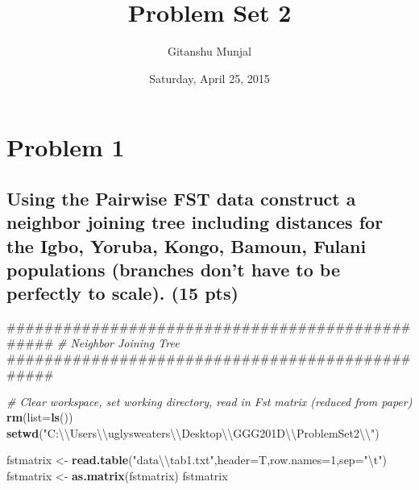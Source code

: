 \documentclass[]{article}
\title{Problem Set 2}
\author{Gitanshu Munjal}
\date{Saturday, April 25, 2015}
\newenvironment{Shaded}{\begin{snugshade}}{\end{snugshade}}
\newcommand{\KeywordTok}[1]{\textcolor[rgb]{0.13,0.29,0.53}{\textbf{{#1}}}}
\newcommand{\DataTypeTok}[1]{\textcolor[rgb]{0.13,0.29,0.53}{{#1}}}
\newcommand{\DecValTok}[1]{\textcolor[rgb]{0.00,0.00,0.81}{{#1}}}
\newcommand{\CharTok}[1]{\textcolor[rgb]{0.31,0.60,0.02}{{#1}}}
\newcommand{\StringTok}[1]{\textcolor[rgb]{0.31,0.60,0.02}{{#1}}}
\newcommand{\CommentTok}[1]{\textcolor[rgb]{0.56,0.35,0.01}{\textit{{#1}}}}
\newcommand{\NormalTok}[1]{{#1}}
\begin{document}
\maketitle


\section{Problem 1}\label{problem-1}

\subsection{Using the Pairwise FST data construct a neighbor joining
tree including distances for the Igbo, Yoruba, Kongo, Bamoun, Fulani
populations (branches don't have to be perfectly to scale). (15
pts)}\label{using-the-pairwise-fst-data-construct-a-neighbor-joining-tree-including-distances-for-the-igbo-yoruba-kongo-bamoun-fulani-populations-branches-dont-have-to-be-perfectly-to-scale.-15-pts}

\begin{Shaded}
\begin{Highlighting}[]
\NormalTok{################################################}
\CommentTok{# Neighbor Joining Tree}
\NormalTok{################################################}

\CommentTok{# Clear workspace, set working directory, read in Fst matrix (reduced from paper)}
\KeywordTok{rm}\NormalTok{(}\DataTypeTok{list=}\KeywordTok{ls}\NormalTok{())}
\KeywordTok{setwd}\NormalTok{(}\StringTok{"C:}\CharTok{\textbackslash{}\textbackslash{}}\StringTok{Users}\CharTok{\textbackslash{}\textbackslash{}}\StringTok{uglysweaters}\CharTok{\textbackslash{}\textbackslash{}}\StringTok{Desktop}\CharTok{\textbackslash{}\textbackslash{}}\StringTok{GGG201D}\CharTok{\textbackslash{}\textbackslash{}}\StringTok{ProblemSet2}\CharTok{\textbackslash{}\textbackslash{}}\StringTok{"}\NormalTok{)}

\NormalTok{fstmatrix <-}\StringTok{ }\KeywordTok{read.table}\NormalTok{(}\StringTok{"data}\CharTok{\textbackslash{}\textbackslash{}}\StringTok{tab1.txt"}\NormalTok{,}\DataTypeTok{header=}\NormalTok{T,}\DataTypeTok{row.names=}\DecValTok{1}\NormalTok{,}\DataTypeTok{sep=}\StringTok{"}\CharTok{\textbackslash{}t}\StringTok{"}\NormalTok{)}
\NormalTok{fstmatrix <-}\StringTok{ }\KeywordTok{as.matrix}\NormalTok{(fstmatrix)}
\NormalTok{fstmatrix}
\end{Highlighting}
\end{Shaded}
\end{document}
